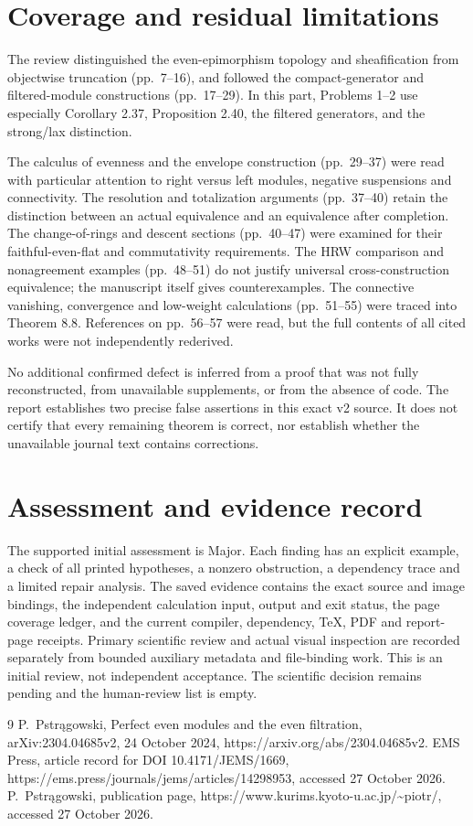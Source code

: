 \documentclass[10pt]{article}
\begin{document}
\section*{Coverage and residual limitations}
The review distinguished the even-epimorphism topology and sheafification from objectwise truncation (pp. 7–16), and followed the compact-generator and filtered-module constructions (pp. 17–29). In this part, Problems 1–2 use especially Corollary 2.37, Proposition 2.40, the filtered generators, and the strong/lax distinction.\par
The calculus of evenness and the envelope construction (pp. 29–37) were read with particular attention to right versus left modules, negative suspensions and connectivity. The resolution and totalization arguments (pp. 37–40) retain the distinction between an actual equivalence and an equivalence after completion. The change-of-rings and descent sections (pp. 40–47) were examined for their faithful-even-flat and commutativity requirements. The HRW comparison and nonagreement examples (pp. 48–51) do not justify universal cross-construction equivalence; the manuscript itself gives counterexamples. The connective vanishing, convergence and low-weight calculations (pp. 51–55) were traced into Theorem 8.8. References on pp. 56–57 were read, but the full contents of all cited works were not independently rederived.\par
No additional confirmed defect is inferred from a proof that was not fully reconstructed, from unavailable supplements, or from the absence of code. The report establishes two precise false assertions in this exact v2 source. It does not certify that every remaining theorem is correct, nor establish whether the unavailable journal text contains corrections.\par
\section*{Assessment and evidence record}
The supported initial assessment is Major. Each finding has an explicit example, a check of all printed hypotheses, a nonzero obstruction, a dependency trace and a limited repair analysis. The saved evidence contains the exact source and image bindings, the independent calculation input, output and exit status, the page coverage ledger, and the current compiler, dependency, TeX, PDF and report-page receipts. Primary scientific review and actual visual inspection are recorded separately from bounded auxiliary metadata and file-binding work. This is an initial review, not independent acceptance. The scientific decision remains pending and the human-review list is empty.\par
9 P. Pstrągowski, Perfect even modules and the even filtration, arXiv:2304.04685v2, 24 October 2024, https://arxiv.org/abs/2304.04685v2. EMS Press, article record for DOI 10.4171/JEMS/1669, https://ems.press/journals/jems/articles/14298953, accessed 27 October 2026. P. Pstrągowski, publication page, https://www.kurims.kyoto-u.ac.jp/\textasciitilde{}piotr/, accessed 27 October 2026.\par
\end{document}
